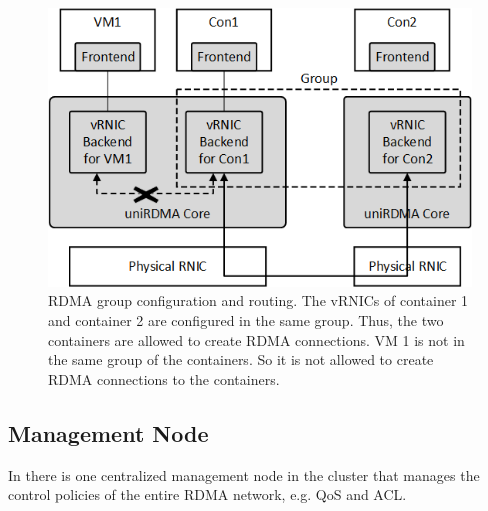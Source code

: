 

\begin{figure}[!ht]
	\centering
	\includegraphics[width=1.0\linewidth]{images/route-config}
	\caption{RDMA group configuration and routing. The vRNICs of container 1 and container 2 are configured in the same group. Thus, the two containers are allowed to create RDMA connections. VM 1 is not in the same group of the containers. So it is not allowed to create RDMA connections to the containers.}
	\label{fig:route-config}
\end{figure}

\subsection{Management Node}

In \sys there is one centralized management node in the cluster that manages the control policies of the entire RDMA network, e.g. QoS and ACL.


